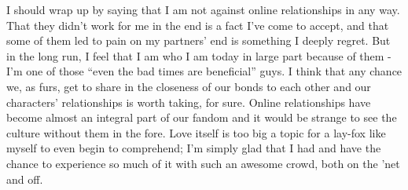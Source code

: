 I should wrap up by saying that I am not against online relationships in any way. That they didn't work for me in the end is a fact I've come to accept, and that some of them led to pain on my partners' end is something I deeply regret. But in the long run, I feel that I am who I am today in large part because of them - I'm one of those ``even the bad times are beneficial'' guys. I think that any chance we, as furs, get to share in the closeness of our bonds to each other and our characters' relationships is worth taking, for sure. Online relationships have become almost an integral part of our fandom and it would be strange to see the culture without them in the fore. Love itself is too big a topic for a lay-fox like myself to even begin to comprehend; I'm simply glad that I had and have the chance to experience so much of it with such an awesome crowd, both on the 'net and off.
